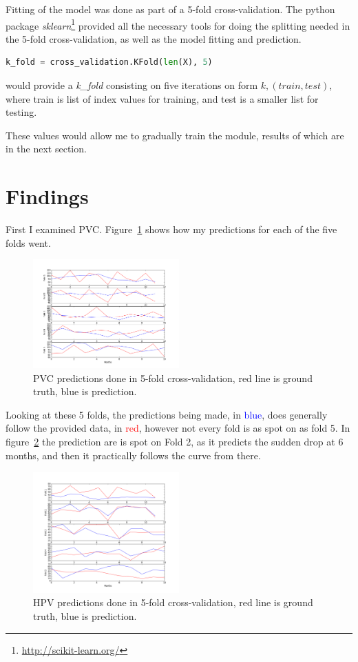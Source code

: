 \documentclass{sig-alternate}
\begin{document}
Fitting of the model was done as part of a 5-fold cross-validation. The python package \textit{sklearn}\footnote{\url{http://scikit-learn.org/}} provided all the necessary tools for doing the splitting needed in the 5-fold cross-validation, as well as the model fitting and prediction.

\begin{lstlisting}[language=Python]
k_fold = cross_validation.KFold(len(X), 5)
\end{lstlisting}

would provide a \textit{k\_fold} consisting on five iterations on form $k, (train, test)$, where train is list of index values for training, and test is a smaller list for testing.

These values would allow me to gradually train the module, results of which are in the next section.

\section{Findings}
First I examined PVC. Figure~\ref{fig:PVC} shows how my predictions for each of the five folds went.
\begin{figure}[h!]
\centering
\includegraphics[width=0.5\textwidth]{PVC_Folds}
\caption{PVC predictions done in 5-fold cross-validation, red line is ground truth, blue is prediction.}
\label{fig:PVC}
\end{figure}
Looking at these 5 folds, the predictions being made, in \textcolor{blue}{blue}, does generally follow the provided data, in \textcolor{red}{red}, however not every fold is as spot on as fold 5. In figure~\ref{fig:HPV} the prediction are is spot on Fold 2, as it predicts the sudden drop at 6 months, and then it practically follows the curve from there.
\begin{figure}[h!]
\centering
\includegraphics[width=0.5\textwidth]{HPV_Folds}
\caption{HPV predictions done in 5-fold cross-validation, red line is ground truth, blue is prediction.}
\label{fig:HPV}
\end{figure}
\end{document}
